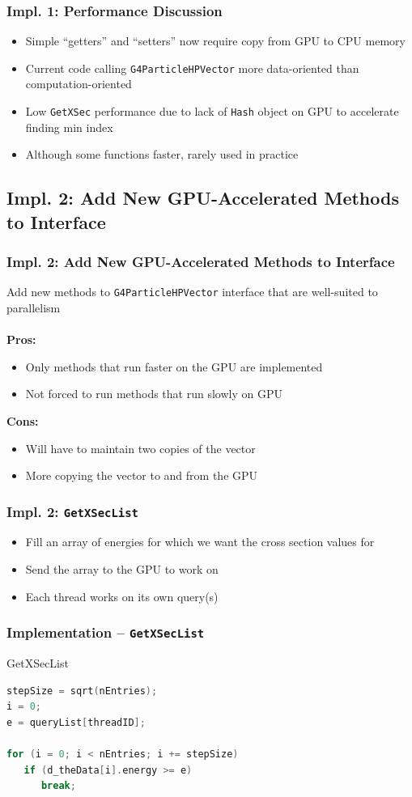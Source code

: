 \documentclass{beamer}
\newcommand\pro{\item[$+$]}
\newcommand\con{\item[$-$]}
\begin{document}
\begin{frame}
\frametitle{Impl. 1: Performance Discussion}
\begin{itemize}
\item Simple ``getters'' and ``setters'' now require copy from GPU to CPU memory
\item Current code calling \texttt{G4ParticleHPVector} more data-oriented than computation-oriented
\item Low \texttt{GetXSec} performance due to lack of \texttt{Hash} object on GPU to accelerate finding min index
\item Although some functions faster, rarely used in practice
\end{itemize}
\end{frame}

\subsection{Impl. 2: Add New GPU-Accelerated Methods to Interface}
\begin{frame}
\frametitle{Impl. 2: Add New GPU-Accelerated Methods to Interface}
Add new methods to \texttt{G4ParticleHPVector} interface that are well-suited to parallelism\\~\\

\textbf{Pros:}
\begin{itemize}
\pro Only methods that run faster on the GPU are implemented
\pro Not forced to run methods that run slowly on GPU
\end{itemize}

\textbf{Cons:}
\begin{itemize}
\con Will have to maintain two copies of the vector
\con More copying the vector to and from the GPU
\end{itemize}
\end{frame}

\begin{frame}
\frametitle{Impl. 2: \texttt{GetXSecList}}
\begin{itemize}
\item Fill an array of energies for which we want the cross section values for
\item Send the array to the GPU to work on
\item Each thread works on its own query(s)
\end{itemize}
\end{frame}

\begin{frame}[fragile]
\frametitle{Implementation -- \texttt{GetXSecList}}
\begin{block}{GetXSecList}
\begin{lstlisting}[language=C++,basicstyle=\ttfamily,keywordstyle=\color{red}]
stepSize = sqrt(nEntries);
i = 0;
e = queryList[threadID];
    
for (i = 0; i < nEntries; i += stepSize) 
   if (d_theData[i].energy >= e) 
      break;
\end{lstlisting}
\end{block}
\end{frame}
\end{document}
